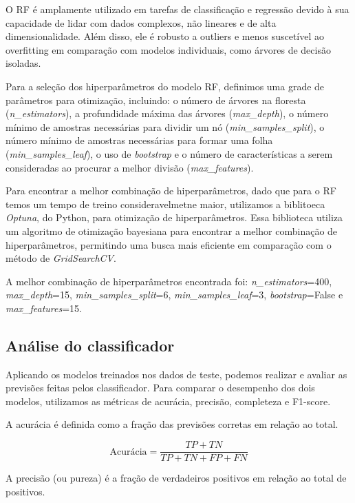 O RF é amplamente utilizado em tarefas de classificação e regressão devido à sua capacidade de lidar com dados complexos, não lineares e de alta dimensionalidade. Além disso, ele é robusto a outliers e menos suscetível ao overfitting em comparação com modelos individuais, como árvores de decisão isoladas.

Para a seleção dos hiperparâmetros do modelo RF, definimos uma grade de parâmetros para otimização, incluindo: o número de árvores na floresta (\textit{n\_estimators}), a profundidade máxima das árvores (\textit{max\_depth}), o número mínimo de amostras necessárias para dividir um nó (\textit{min\_samples\_split}), o número mínimo de amostras necessárias para formar uma folha (\textit{min\_samples\_leaf}), o uso de \textit{bootstrap} e o número de características a serem consideradas ao procurar a melhor divisão (\textit{max\_features}).

Para encontrar a melhor combinação de hiperparâmetros, dado que para o RF temos um tempo de treino consideravelmetne maior, utilizamos a biblitoeca \textit{Optuna}, do Python, para otimização de hiperparâmetros. Essa biblioteca utiliza um algoritmo de otimização bayesiana para encontrar a melhor combinação de hiperparâmetros, permitindo uma busca mais eficiente em comparação com o método de \textit{GridSearchCV}.

A melhor combinação de hiperparâmetros encontrada foi: \textit{n\_estimators}=400, \textit{max\_depth}=15, \textit{min\_samples\_split}=6, \textit{min\_samples\_leaf}=3, \textit{bootstrap}=False e \textit{max\_features}=15.



\subsection{Análise do classificador}\label{subsec:analise_modelo}
Aplicando os modelos treinados nos dados de teste, podemos realizar e avaliar as previsões feitas pelos classificador. Para comparar o desempenho dos dois modelos, utilizamos as métricas de acurácia, precisão, completeza e F1-score.

A acurácia é definida como a fração das previsões corretas em relação ao total. 

\begin{equation}
    \text{Acurácia} = \frac{TP + TN}{TP + TN + FP + FN}
\end{equation}

A precisão (ou pureza) é a fração de verdadeiros positivos em relação ao total de positivos. 

